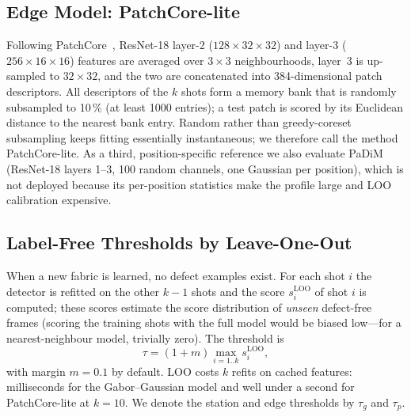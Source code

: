 \subsection{Edge Model: PatchCore-lite}\label{sec:pc}
Following PatchCore~\cite{roth2022patchcore}, ResNet-18 layer-2 ($128\times32\times32$) and layer-3 ($256\times16\times16$) features are averaged over $3\times3$ neighbourhoods, layer~3 is up-sampled to $32\times32$, and the two are concatenated into 384-dimensional patch descriptors. All descriptors of the $k$ shots form a memory bank that is randomly subsampled to 10\,\% (at least 1000 entries); a test patch is scored by its Euclidean distance to the nearest bank entry. Random rather than greedy-coreset subsampling keeps fitting essentially instantaneous; we therefore call the method PatchCore-lite. As a third, position-specific reference we also evaluate PaDiM~\cite{defard2021padim} (ResNet-18 layers 1--3, 100 random channels, one Gaussian per position), which is not deployed because its per-position statistics make the profile large and LOO calibration expensive.

\subsection{Label-Free Thresholds by Leave-One-Out}\label{sec:loo}
When a new fabric is learned, no defect examples exist. For each shot $i$ the detector is refitted on the other $k-1$ shots and the score $s_i^{\mathrm{LOO}}$ of shot $i$ is computed; these scores estimate the score distribution of \emph{unseen} defect-free frames (scoring the training shots with the full model would be biased low---for a nearest-neighbour model, trivially zero). The threshold is
\begin{equation}
\tau=(1+m)\max_{i=1..k}s_i^{\mathrm{LOO}},\label{eq:tau}
\end{equation}
with margin $m=0.1$ by default. LOO costs $k$ refits on cached features: milliseconds for the Gabor--Gaussian model and well under a second for PatchCore-lite at $k=10$. We denote the station and edge thresholds by $\tau_g$ and $\tau_p$.

